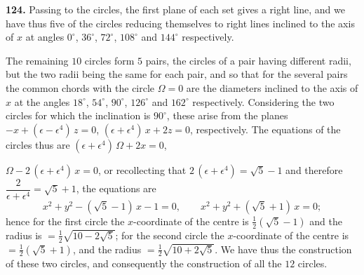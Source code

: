 \documentclass[11pt]{article}
\newcommand{\artno}[1]{\textbf{#1.}\quad}
\begin{document}
\medskip
\noindent
\artno{124} Passing to the circles, the first plane of each set gives a
right line, and we have thus five of the circles reducing themselves to right
lines inclined to the axis of $x$ at angles $0^{\circ}$, $36^{\circ}$,
$72^{\circ}$, $108^{\circ}$ and $144^{\circ}$ respectively.

The remaining $10$ circles form $5$ pairs, the circles of a pair having
different radii, but the two radii being the same for each pair, and so that
for the several pairs the common chords with the circle $\Omega = 0$ are the
diameters inclined to the axis of $x$ at the angles $18^{\circ}$,
$54^{\circ}$, $90^{\circ}$, $126^{\circ}$ and $162^{\circ}$ respectively.
Considering the two circles for which the inclination is $90^{\circ}$, these
arise from the planes $-x + (\epsilon - \epsilon^{4})\,z = 0$,
$(\epsilon + \epsilon^{4})\,x + 2z = 0$, respectively. The equations of the
circles thus are $(\epsilon + \epsilon^{4})\,\Omega + 2x = 0$,

\bigskip
\noindent
$\Omega - 2\,(\epsilon + \epsilon^{4})\,x = 0$, or recollecting that
$2\,(\epsilon + \epsilon^{4}) = \sqrt{5} - 1$ and therefore
$\dfrac{2}{\epsilon + \epsilon^{4}} = \sqrt{5} + 1$,
the equations are
\[
  x^{2} + y^{2} - (\sqrt{5} - 1)\,x - 1 = 0,\qquad
  x^{2} + y^{2} + (\sqrt{5} + 1)\,x = 0;
\]
hence for the first circle the $x$-coordinate of the centre is
$\tfrac{1}{2}(\sqrt{5} - 1)$ and the radius is
$= \tfrac{1}{2}\sqrt{10 - 2\sqrt{5}}$; for the second circle the
$x$-coordinate of the centre is $= \tfrac{1}{2}(\sqrt{5} + 1)$, and the
radius $= \tfrac{1}{2}\sqrt{10 + 2\sqrt{5}}$. We have thus the construction
of these two circles, and consequently the construction of all the $12$
circles.
\end{document}
